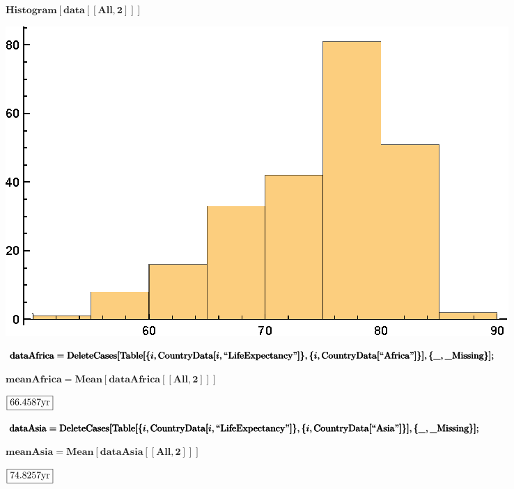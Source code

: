 \documentclass{article}
\begin{document}
\begin{doublespace}
\noindent\(\pmb{\text{Histogram}[\text{data}[[\text{All},2]]]}\)
\end{doublespace}

\includegraphics{WLG_gr1.eps}

\begin{doublespace}
\noindent\(\pmb{\text{dataAfrica}=\text{DeleteCases}[}\\
\pmb{\text{Table}[\{i,\text{CountryData}[i,\text{{``}LifeExpectancy{''}}]\},\{i,\text{CountryData}[\text{{``}Africa{''}}]\}],\{\_,\text{$\_$Missing}\}];}\)
\end{doublespace}

\begin{doublespace}
\noindent\(\pmb{\text{meanAfrica}=\text{Mean}[\text{dataAfrica}[[\text{All},2]]]}\)
\end{doublespace}

\begin{doublespace}
\noindent\(\fbox{$66.4587\text{yr}$}\)
\end{doublespace}

\begin{doublespace}
\noindent\(\pmb{\text{dataAsia}=\text{DeleteCases}[}\\
\pmb{\text{Table}[\{i,\text{CountryData}[i,\text{{``}LifeExpectancy{''}}]\},\{i,\text{CountryData}[\text{{``}Asia{''}}]\}],\{\_,\text{$\_$Missing}\}];}\)
\end{doublespace}

\begin{doublespace}
\noindent\(\pmb{\text{meanAsia}=\text{Mean}[\text{dataAsia}[[\text{All},2]]]}\)
\end{doublespace}

\begin{doublespace}
\noindent\(\fbox{$74.8257\text{yr}$}\)
\end{doublespace}
\end{document}

